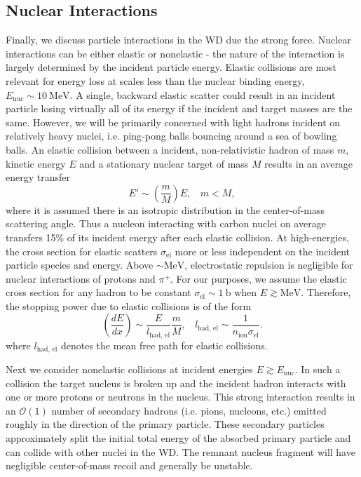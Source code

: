 \documentclass[twocolumn,showpacs,preprintnumbers,amsmath,amssymb,prd]{revtex4}
\newcommand{\OO}{\mathcal{O}}
\def\r{\right)}
\def\l{\left(}
\begin{document}
\begin{appendices}
\subsection{Nuclear Interactions}
Finally, we discuss particle interactions in the WD due the strong force. 
Nuclear interactions can be either elastic or nonelastic - the nature of the interaction is largely determined by the incident particle energy. 
Elastic collisions are most relevant for energy loss at scales less than the nuclear binding energy, $E_\text{nuc} \sim 10 ~\text{MeV}$.
A single, backward elastic scatter could result in an incident particle losing virtually all of its energy if the incident and target masses are the same.
However, we will be primarily concerned with light hadrons incident on relatively heavy nuclei, i.e. ping-pong balls bouncing around a sea of bowling balls.
An elastic collision between a incident, non-relativistic hadron of mass $m$, kinetic energy $E$ and a stationary nuclear target of mass $M$ results in an average energy transfer
\begin{equation}
\label{eq:elasticratio}
E' \sim \l \frac{m}{M}\r E, ~~~~ m < M,
\end{equation}
where it is assumed there is an isotropic distribution in the center-of-mass scattering angle.
Thus a nucleon interacting with carbon nuclei on average transfers 15\% of its incident energy after each elastic collision.
At high-energies, the cross section for elastic scatters $\sigma_\text{el}$ more or less independent on the incident particle species and energy.
Above $\sim \text{MeV}$, electrostatic repulsion is negligible for nuclear interactions of protons and $\pi^+$. 
For our purposes, we assume the elastic cross section for any hadron to be constant $\sigma_\text{el} \sim 1 ~\text{b}$ when $E \gtrsim \text{MeV}$. 
Therefore, the stopping power due to elastic collisions is of the form
\begin{equation}
\l \frac{dE}{dx} \r \sim \frac{E}{l_\text{had, el}} \frac{m}{M}, ~~~~ l_\text{had, el} \sim \frac{1}{n_\text{ion} \sigma_\text{el}}.
\end{equation}
where $l_\text{had, el}$ denotes the mean free path for elastic collisions. 

Next we consider nonelastic collisions at incident energies $E \gtrsim E_\text{nuc}$.
In such a collision the target nucleus is broken up and the incident hadron interacts with one or more protons or neutrons in the nucleus. 
This strong interaction results in an $\OO(1)$ number of secondary hadrons (i.e. pions, nucleons, etc.) emitted roughly in the direction of the primary particle.
These secondary particles approximately split the initial total energy of the absorbed primary particle and can collide with other nuclei in the WD.
The remnant nucleus fragment will have negligible center-of-mass recoil and generally be unstable.


\end{appendices}
\end{document}
